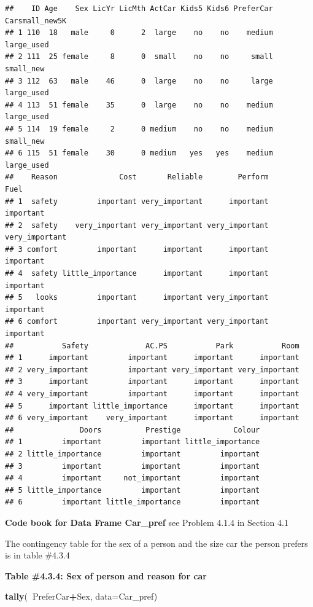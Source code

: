 \documentclass[]{book}
\newenvironment{Shaded}{\begin{snugshade}}{\end{snugshade}}
\newcommand{\DataTypeTok}[1]{\textcolor[rgb]{0.13,0.29,0.53}{#1}}
\newcommand{\KeywordTok}[1]{\textcolor[rgb]{0.13,0.29,0.53}{\textbf{#1}}}
\newcommand{\NormalTok}[1]{#1}
\newcommand{\OperatorTok}[1]{\textcolor[rgb]{0.81,0.36,0.00}{\textbf{#1}}}
\begin{document}
\begin{verbatim}
##    ID Age    Sex LicYr LicMth ActCar Kids5 Kids6 PreferCar Carsmall_new5K
## 1 110  18   male     0      2  large    no    no    medium     large_used
## 2 111  25 female     8      0  small    no    no     small      small_new
## 3 112  63   male    46      0  large    no    no     large     large_used
## 4 113  51 female    35      0  large    no    no    medium     large_used
## 5 114  19 female     2      0 medium    no    no    medium      small_new
## 6 115  51 female    30      0 medium   yes   yes    medium     large_used
##    Reason              Cost       Reliable        Perform           Fuel
## 1  safety         important very_important      important      important
## 2  safety    very_important very_important very_important very_important
## 3 comfort         important      important      important      important
## 4  safety little_importance      important      important      important
## 5   looks         important      important very_important      important
## 6 comfort         important very_important very_important      important
##           Safety             AC.PS           Park           Room
## 1      important         important      important      important
## 2 very_important         important very_important very_important
## 3      important         important      important      important
## 4 very_important         important      important      important
## 5      important little_importance      important      important
## 6 very_important    very_important      important      important
##               Doors          Prestige            Colour
## 1         important         important little_importance
## 2 little_importance         important         important
## 3         important         important         important
## 4         important     not_important         important
## 5 little_importance         important         important
## 6         important little_importance         important
\end{verbatim}

\textbf{Code book for Data Frame Car\_pref} see Problem 4.1.4 in Section 4.1

The contingency table for the sex of a person and the size car the person prefers is in table \#4.3.4

\textbf{Table \#4.3.4: Sex of person and reason for car}

\begin{Shaded}
\begin{Highlighting}[]
\KeywordTok{tally}\NormalTok{(}\OperatorTok{~}\NormalTok{PreferCar}\OperatorTok{+}\NormalTok{Sex, }\DataTypeTok{data=}\NormalTok{Car_pref)}
\end{Highlighting}
\end{Shaded}
\end{document}
